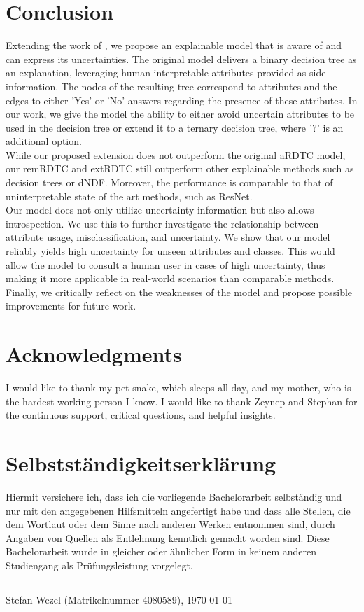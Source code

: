 \documentclass[a4paper,cleardoubleempty,BCOR1cm, 11pt]{report}
\begin{document}
\chapter{Conclusion}
Extending the work of \citet{alaniz2019explainable}, we propose an explainable model that is aware of and can express its uncertainties. The original model delivers a binary decision tree as an explanation, leveraging human-interpretable attributes provided as side information. The nodes of the resulting tree correspond to attributes and the edges to either 'Yes' or 'No' answers regarding the presence of these attributes. In our work, we give the model the ability to either avoid uncertain attributes to be used in the decision tree or extend it to a ternary decision tree, where '?' is an additional option.\\
While our proposed extension does not outperform the original aRDTC model, our remRDTC and extRDTC still outperform other explainable methods such as decision trees or dNDF. Moreover, the performance is comparable to that of uninterpretable state of the art methods, such as ResNet.\\
Our model does not only utilize uncertainty information but also allows introspection. We use this to further investigate the relationship between attribute usage, misclassification, and uncertainty.
We show that our model reliably yields high uncertainty for unseen attributes and classes. This would allow the model to consult a human user in cases of high uncertainty, thus making it more applicable in real-world scenarios than comparable methods.
Finally, we critically reflect on the weaknesses of the model and propose possible improvements for future work.









\chapter*{Acknowledgments}
I would like to thank my pet snake, which sleeps all day, and my mother, who is the hardest working person I know. I would like to thank Zeynep and Stephan for the continuous support, critical questions, and helpful insights.



\chapter*{Selbstst\"andigkeitserkl\"arung}
Hiermit versichere ich, dass ich die vorliegende Bachelorarbeit selbst\"andig und
nur mit den angegebenen Hilfsmitteln angefertigt habe und dass alle Stellen,
die dem Wortlaut oder dem Sinne nach anderen Werken entnommen sind,
durch Angaben von Quellen als Entlehnung kenntlich gemacht worden sind.
Diese Bachelorarbeit wurde in gleicher oder \"ahnlicher Form in keinem anderen
Studiengang als Pr\"ufungsleistung vorgelegt.

\vspace*{8ex}
\hrule
\vspace*{2ex}
Stefan Wezel (Matrikelnummer 4080589), \today
\end{document}
